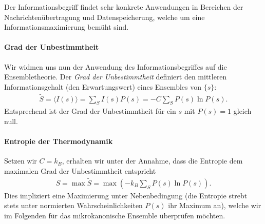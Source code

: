 Der Informationsbegriff findet sehr konkrete Anwendungen in Bereichen der Nachrichtenübertragung und Datenspeicherung, welche um eine Informationsmaximierung bemüht sind. 

\paragraph*{Grad der Unbestimmtheit} Wir widmen uns nun der Anwendung des Informationsbegriffes auf die Ensembletheorie. Der \emph{Grad der Unbestimmtheit} definiert den mittleren Informationsgehalt (den Erwartungswert) eines Ensembles von $\{s\}$:
\begin{align}
    \label{eq:Unbestimmtheitsgrad}
    \widetilde{S}=\langle I(s)\rangle=\sum_S I(s)P(s)=-C\sum_S P(s)\ln P(s).
\end{align}
Entsprechend ist der Grad der Unbestimmtheit für ein $s$ mit $P(s)=1$ gleich null.
\paragraph*{Entropie der Thermodynamik} Setzen wir $C=k_B$, erhalten wir unter der Annahme, dass die Entropie dem maximalen Grad der Unbestimmtheit entspricht 
\begin{align*}
    S=\max \widetilde{S}=\max \left(-k_B \sum_S P(s)\ln P(s)\right).
\end{align*}
Dies impliziert eine Maximierung unter Nebenbedingung (die Entropie strebt stets unter normierten Wahrscheinlichkeiten $P(s)$ ihr Maximum an), welche wir im Folgenden für das mikrokanonische Ensemble überprüfen möchten.

